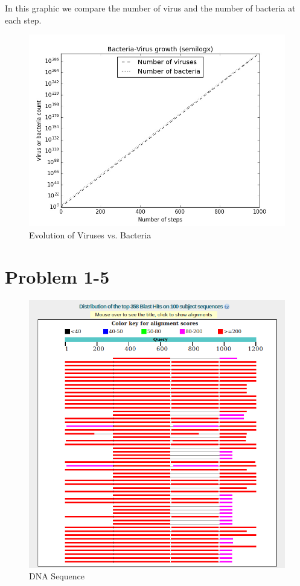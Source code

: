 \documentclass{article}
\begin{document}
In this graphic we compare the number of virus and the number of bacteria at each step.

\begin{figure}[H]
\begin{center}
\includegraphics[scale = .4]{Virus}
\end{center}
\caption{Evolution of Viruses vs. Bacteria}
\end{figure}

\section*{Problem 1-5}

\begin{figure}[H]
\begin{center}
\includegraphics[scale = .4]{Dinosaur}
\end{center}
\caption{DNA Sequence}
\end{figure}
\end{document}
